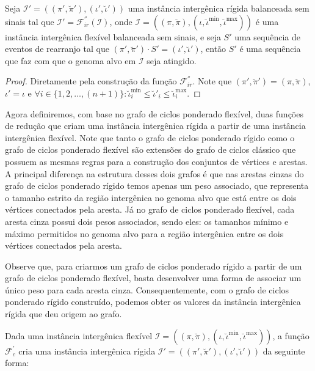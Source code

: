 \begin{lemma}\label{lemma:KIVEWTOR}
Seja $\mathcal{I'} = ((\pi',\breve\pi'),(\iota',\breve\iota'))$ uma instância intergênica rígida balanceada sem sinais tal que $\mathcal{I'} = \mathcal{F}_{ir}^{''}(\mathcal{I})$, onde $\mathcal{I} = ((\pi,\breve\pi),(\iota,\breve\iota^{\min},\breve\iota^{\max}))$ é uma instância intergênica flexível balanceada sem sinais, e seja $S'$ uma sequência de eventos de rearranjo tal que $(\pi',\breve\pi') \cdot S' = (\iota',\breve\iota')$, então $S'$ é uma sequência que faz com que o genoma alvo em $\mathcal{I}$ seja atingido.
\end{lemma}
\begin{proof}
Diretamente pela construção da função $\mathcal{F}_{ir}^{''}$. Note que $(\pi',\breve\pi') = (\pi,\breve\pi)$, $\iota' = \iota$ e $\forall i \in \{1,2,\dots,({n+1})\}: \breve\iota^{\min}_i \le \breve\iota'_i \le \breve\iota^{\max}_i$.
\end{proof}

Agora definiremos, com base no grafo de ciclos ponderado flexível, duas funções de redução que criam uma instância intergênica rígida a partir de uma instância intergênica flexível. Note que tanto o grafo de ciclos ponderado rígido como o grafo de ciclos ponderado flexível são extensões do grafo de ciclos clássico que possuem as mesmas regras para a construção dos conjuntos de vértices e arestas. A principal diferença na estrutura desses dois grafos é que nas arestas cinzas do grafo de ciclos ponderado rígido temos apenas um peso associado, que representa o tamanho estrito da região intergênica no genoma alvo que está entre os dois vértices conectados pela aresta. Já no grafo de ciclos ponderado flexível, cada aresta cinza possui dois pesos associados, sendo eles: os tamanhos mínimo e máximo permitidos no genoma alvo para a região intergênica entre os dois vértices conectados pela aresta. 

Observe que, para criarmos um grafo de ciclos ponderado rígido a partir de um grafo de ciclos ponderado flexível, basta desenvolver uma forma de associar um único peso para cada aresta cinza. Consequentemente, com o grafo de ciclos ponderado rígido construído, podemos obter os valores da instância intergênica rígida que deu origem ao grafo.

Dada uma instância intergênica flexível $\mathcal{I} = ((\pi,\breve\pi),(\iota,\breve\iota^{\min},\breve\iota^{\max}))$, a função $\mathcal{F}_{c}^{'}$ cria uma instância intergênica rígida $\mathcal{I'} = ((\pi',\breve\pi'),(\iota',\breve\iota'))$ da seguinte forma:

